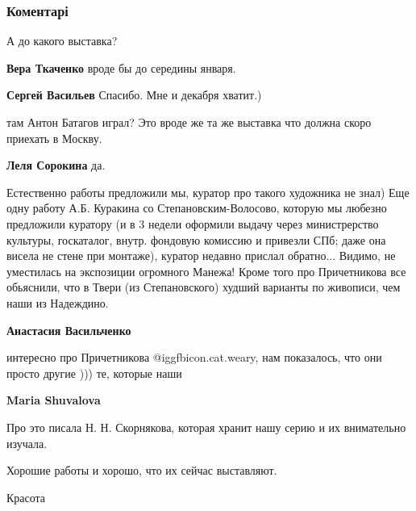 
 
 
 
 
\subsubsection{Коментарі}

\begin{itemize} %
А до какого выставка?

\textbf{Вера Ткаченко} вроде бы до середины января.

\textbf{Сергей Васильев} Спасибо. Мне и декабря хватит.)

там Антон Батагов играл? Это вроде же та же выставка что должна скоро приехать в Москву.

\textbf{Леля Сорокина} да.


Естественно работы предложили мы, куратор про такого художника не знал) Еще
одну работу А.Б. Куракина со Степановским-Волосово, которую мы любезно
предложили куратору (и в 3 недели оформили выдачу через министрерство культуры,
госкаталог, внутр. фондовую комиссию и привезли СПб; даже она висела не стене
при монтаже), куратор недавно прислал обратно... Видимо, не уместилась на
экспозиции огромного Манежа! Кроме того про Причетникова все обьяснили, что в
Твери (из Степановского) худший варианты по живописи, чем наши из Надеждино.

\textbf{Анастасия Васильченко} 

интересно про Причетникова  @igg{fbicon.cat.weary}, нам показалось, что они
просто другие ))) те, которые наши

\textbf{Maria Shuvalova} 

Про это писала Н. Н. Скорнякова, которая хранит нашу серию и их внимательно изучала.

Хорошие работы и хорошо, что их сейчас выставляют.

Красота

\end{itemize} %
